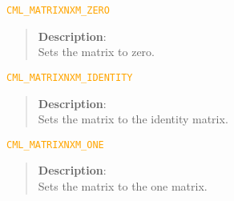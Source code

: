 \documentclass[a4paper,oneside,8pt]{extarticle}
\newcommand{\macro}[1]{
  \noindent\textcolor{orange}{\texttt{#1}}
  \vspace{-0.3em}
}
\theoremstyle{definition}
\begin{document}
\macro{CML\_MATRIXNXM\_ZERO}
\begin{quote}
  \textbf{Description}: \\
  Sets the matrix to zero. \\
\end{quote}

\macro{CML\_MATRIXNXM\_IDENTITY}
\begin{quote}
  \textbf{Description}: \\
  Sets the matrix to the identity matrix. \\
\end{quote}

\macro{CML\_MATRIXNXM\_ONE}
\begin{quote}
  \textbf{Description}: \\
  Sets the matrix to the one matrix. \\
\end{quote}
\end{document}
